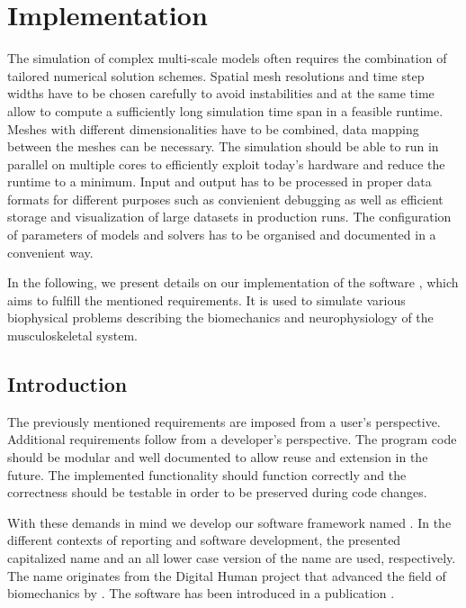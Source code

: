 \chapter{Implementation}

The simulation of complex multi-scale models often requires the combination of tailored numerical solution schemes. Spatial mesh resolutions and time step widths have to be chosen carefully to avoid instabilities and at the same time allow to compute a sufficiently long simulation time span in a feasible runtime.
Meshes with different dimensionalities have to be combined, data mapping between the meshes can be necessary. 
The simulation should be able to run in parallel on multiple cores to efficiently exploit today's hardware and reduce the runtime to a minimum. Input and output has to be processed in proper data formats for different purposes such as convienient debugging as well as efficient storage and visualization of large datasets in production runs. The configuration of parameters of models and solvers has to be organised and documented in a convenient way.

In the following, we present details on our implementation of the software \opendihu{}, which aims to fulfill the mentioned requirements. It is used to simulate various biophysical problems describing the biomechanics and neurophysiology of the musculoskeletal system.

\section{Introduction}

The previously mentioned requirements are imposed from a user's perspective. 
Additional requirements follow from a developer's perspective. The program code should be modular and well documented to allow reuse and extension in the future. The implemented functionality should function correctly and the correctness should be testable in order to be preserved during code changes.

With these demands in mind we develop our software framework named \emph{\opendihu{}}. In the different contexts of reporting and software development, the presented capitalized name and an all lower case version of the name are used, respectively. The name originates from the Digital Human project that advanced the field of biomechanics by  \cite{DihuWeb}.
The software has been introduced in a publication \cite{Maier2019}.

